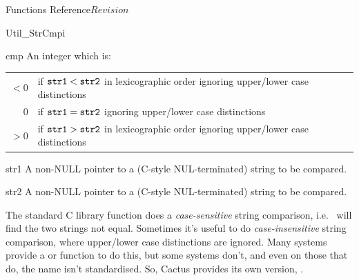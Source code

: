 \begin{cactuspart}{ Functions Reference}{}{$Revision$}
\begin{FunctionDescription}{Util\_StrCmpi}
\begin{ResultSection}
\begin{Result}{cmp}
An integer which is:\\
\begin{tabular}{@{}rl}
$<0$	& if $\mbox{\texttt{str1}} < \mbox{\texttt{str2}}$ in lexicographic order
	  ignoring upper/lower case distinctions			\\
$0$	& if $\mbox{\texttt{str1}} = \mbox{\texttt{str2}}$
	  ignoring upper/lower case distinctions			\\
$>0$	& if $\mbox{\texttt{str1}} > \mbox{\texttt{str2}}$ in lexicographic order
	  ignoring upper/lower case distinctions			%
\end{tabular}
\end{Result}
\end{ResultSection}

\begin{ParameterSection}
\begin{Parameter}{str1}
A non-NULL pointer to a (C-style NUL-terminated) string to be compared.
\end{Parameter}
\begin{Parameter}{str2}
A non-NULL pointer to a (C-style NUL-terminated) string to be compared.
\end{Parameter}
\end{ParameterSection}

\begin{Discussion}
The standard C library  function does a {\em case-sensitive\/}
string comparison, i.e.\  will find the
two strings not equal.  Sometimes it's useful to do {\em case-insensitive\/}
string comparison, where upper/lower case distinctions are ignored.
Many systems provide a  or 
function to do this, but some systems don't, and even on those that do,
the name isn't standardised.  So, Cactus provides its own version,
.


\end{Discussion}
\end{FunctionDescription}
\end{cactuspart}
